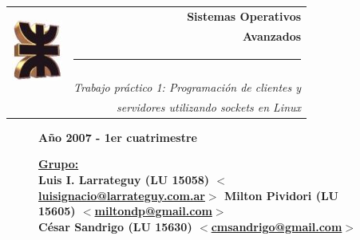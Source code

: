 \thispagestyle{empty}

\begin{center}
\begin{tabular}{cr}
\multirow{5}{*}{ \includegraphics{logoUTN.jpg} }
& \Huge\bfseries Sistemas Operativos \\
& \Huge\bfseries Avanzados \\
& \noindent\rule[-1ex]{120mm}{4pt} \\
& \\
& \noindent\large\emph{Trabajo práctico 1: Programación de clientes y} \\
& \noindent\large\emph{servidores utilizando sockets en Linux}
\end{tabular}
\end{center}


\begin{figure}[b]
\center\large\textbf{Año 2007 - 1er cuatrimestre}
\normalsize
\linebreak
\begin{flushleft}
\bfseries
\underline{Grupo:}\\
Luis I. Larrateguy (\textnormal{LU} 15058) \href{mailto:luisignacio@larrateguy.com.ar}
  {$<$luisignacio@larrateguy.com.ar$>$}
Milton Pividori (\textnormal{LU} 15605) \href{mailto:miltondp@gmail.com}
  {$<$miltondp@gmail.com$>$}\\
César Sandrigo (\textnormal{LU} 15630) \href{mailto:cmsandrigo@gmail.com}
  {$<$cmsandrigo@gmail.com$>$}
\end{flushleft}

\end{figure}
